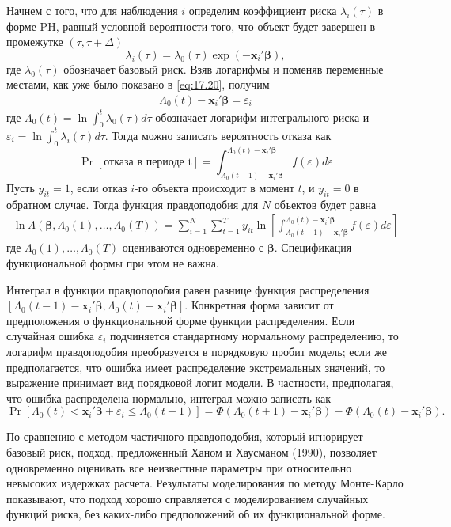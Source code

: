 Начнем с того, что для наблюдения $i$ определим коэффициент риска $\lambda_i(\tau)$ в форме PH, равный условной вероятности того, что объект будет завершен в промежутке $(\tau,\tau+\Delta)$
        $$\lambda_i(\tau)=\lambda_0(\tau)\exp(-\mathbf{x}_i'\bm{\beta}),$$
где $\lambda_0(\tau)$ обозначает базовый риск. Взяв логарифмы и поменяв переменные местами, как уже было показано в \ref{eq:17.20}, получим
        \begin{align}
        \label{eq:17.43}
        \Lambda_0(t)-\mathbf{x}_i'\bm{\beta}=\varepsilon_i
        \end{align}
где $\Lambda_0(t)=\ln\int^{t}_{0}\lambda_0(\tau)d\tau$ обозначает логарифм интегрального риска и $\varepsilon_i=\ln\int^{t}_{0}\lambda_i(\tau)d\tau$. Тогда можно записать вероятность отказа как
        $$\Pr[\textrm{отказа в периоде t}]=\int^{\Lambda_0(t)-\mathbf{x}_i'\bm{\beta}}_{\Lambda_0(t-1)-\mathbf{x}_i'\bm{\beta}}f(\varepsilon)d\varepsilon$$
Пусть $y_{it}=1$, если отказ $i$-го объекта происходит в момент $t$, и $y_{it}=0$ в обратном случае. Тогда функция правдоподобия для $N$ объектов будет равна
        \begin{align}
        \label{eq:17.44}
        \ln\Lambda(\bm{\beta},\Lambda_0(1), \ldots ,\Lambda_0(T))=\sum^{N}_{i=1}\sum^{T}_{t=1}y_{it}\ln\left[\int^{\Lambda_0(t)-\mathbf{x}_i'\bm{\beta}}_{\Lambda_0(t-1)-\mathbf{x}_i'\bm{\beta}}f(\varepsilon)d\varepsilon\right]
        \end{align}
где $\Lambda_0(1), \ldots ,\Lambda_0(T)$ оцениваются одновременно с $\bm{\beta}$. Спецификация функциональной формы при этом не важна.

Интеграл в функции правдоподобия равен разнице функция распределения $[\Lambda_0(t-1)-\mathbf{x}_i'\bm{\beta},\Lambda_0(t)-\mathbf{x}_i'\bm{\beta}]$. Конкретная форма зависит от предположения о функциональной форме функции распределения. Если случайная ошибка $\varepsilon_i$ подчиняется стандартному нормальному распределению, то логарифм правдоподобия преобразуется в порядковую пробит модель; если же предполагается, что ошибка имеет распределение экстремальных значений, то выражение принимает вид порядковой логит модели. В частности, предполагая, что ошибка распределена нормально, интеграл можно записать как
    $$\Pr[\Lambda_0(t)<\mathbf{x}_i'\bm{\beta}+\varepsilon_i\le\Lambda_0(t+1)]=\Phi(\Lambda_0(t+1)-\mathbf{x}_i'\bm{\beta})-\Phi(\Lambda_0(t)-\mathbf{x}_i'\bm{\beta}).$$

По сравнению с методом частичного правдоподобия, который игнорирует базовый риск, подход, предложенный Ханом и Хаусманом (1990), позволяет одновременно оценивать все неизвестные параметры при относительно невысоких издержках расчета. Результаты моделирования по методу Монте-Карло показывают, что подход хорошо справляется с моделированием случайных функций риска, без каких-либо предположений об их функциональной форме.

